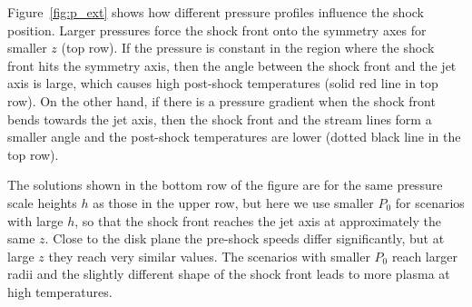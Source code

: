 \documentclass{emulateapj}
\begin{document}
Figure~\ref{fig:p_ext} shows how different pressure profiles influence the shock position. Larger pressures force the shock front onto the symmetry axes for smaller $z$ (top row). If the pressure is constant in the region where the shock front hits the symmetry axis, then the angle between the shock front and the jet axis is large, which causes high post-shock temperatures (solid red line in top row). On the other hand, if there is a pressure gradient when the shock front bends towards the jet axis, then the shock front and the stream lines form a smaller angle and the post-shock temperatures are lower (dotted black line in the top row).

The solutions shown in the bottom row of the figure are for the same pressure scale heights $h$ as those in the upper row, but here we use smaller $P_0$ for scenarios with large $h$, so that the shock front reaches the jet axis at approximately the same $z$. Close to the disk plane the pre-shock speeds differ significantly, but at large $z$ they reach very similar values. The scenarios with smaller $P_0$ reach larger radii and the slightly different shape of the shock front leads to more plasma at high temperatures.
\end{document}
